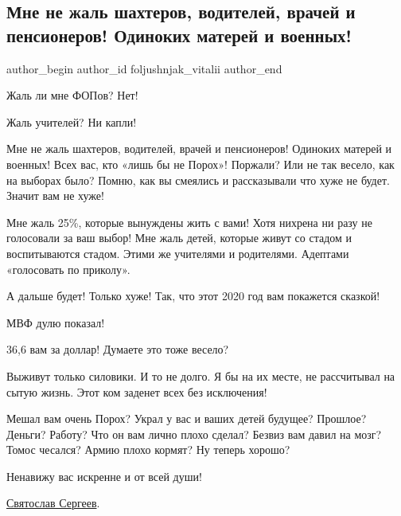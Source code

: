  
 
 
 
 
 
\subsection{Мне не жаль шахтеров, водителей, врачей и пенсионеров! Одиноких матерей и военных!}
\label{sec:24_11_2020.fb.foljushnjak_vitalii.1.mne_ne_zhal}
\ifcmt
	author_begin
   author_id foljushnjak_vitalii
	author_end
\fi

Жаль ли мне ФОПов? Нет!

Жаль учителей? Ни капли!

Мне не жаль шахтеров, водителей, врачей и пенсионеров! Одиноких матерей и
военных! Всех вас, кто «лишь бы не Порох»! Поржали? Или не так весело, как на
выборах было? Помню, как вы смеялись и рассказывали что хуже не будет. Значит
вам не хуже! 

Мне жаль 25\%, которые вынуждены жить с вами! Хотя нихрена ни разу не
голосовали за ваш выбор! Мне жаль детей, которые живут со стадом и
воспитываются стадом. Этими же учителями и родителями. Адептами «голосовать по
приколу».

А дальше будет! Только хуже! Так, что этот 2020 год вам покажется сказкой!

МВФ дулю показал!

36,6 вам за доллар! Думаете это тоже весело?

Выживут только силовики. И то не долго. Я бы на их месте, не рассчитывал на
сытую жизнь. Этот ком заденет всех без исключения!

Мешал вам очень Порох? Украл у вас и ваших детей будущее? Прошлое? Деньги?
Работу? Что он вам лично плохо сделал? Безвиз вам давил на мозг? Томос чесался?
Армию плохо кормят? Ну теперь хорошо?

Ненавижу вас искренне и от всей души!

\href{https://www.facebook.com/profile.php?id=100040844777506}{Святослав Сергеев}.
